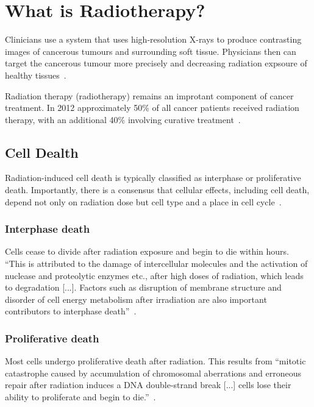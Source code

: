 \documentclass[11pt]{article}
\begin{document}


\tableofcontents

\clearpage

\section{What is Radiotherapy?}

Clinicians use a system that uses high-resolution X-rays to produce contrasting images of cancerous tumours and surrounding soft tissue. Physicians then can target the cancerous tumour more precisely and decreasing radiation expsoure of healthy tissues~\cite{radiotherapy-basic-concepts}.

Radiation therapy (radiotherapy) remains an improtant component of cancer treatment. In 2012 approximately 50\% of all cancer patients received radiation therapy, with an additional 40\% involving curative treatment~\cite{radiotherapy-advances}.

\subsection{Cell Dealth}

Radiation-induced cell death is typically classified as interphase or proliferative death. Importantly, there is a consensus that cellular effects, including cell death, depend not only on radiation dose but cell type and a place in cell cycle~\cite{cell-death}.

\subsubsection{Interphase death}

Cells cease to divide after radiation exposure and begin to die within hours. ``This is attributed to the damage of intercellular molecules and the activation of nuclease and proteolytic enzymes etc., after high doses of radiation, which leads to degradation [...]. Factors such as disruption of membrane structure and disorder of cell energy metabolism after irradiation are also important contributors to interphase death''~\cite{cell-death}.

\subsubsection{Proliferative death}

Most cells undergo proliferative death after radiation. This results from ``mitotic catastrophe caused by accumulation of chromosomal aberrations and erroneous repair after radiation induces a DNA double-strand break [...] cells lose their ability to proliferate and begin to die.''~\cite{cell-death}.
\end{document}
